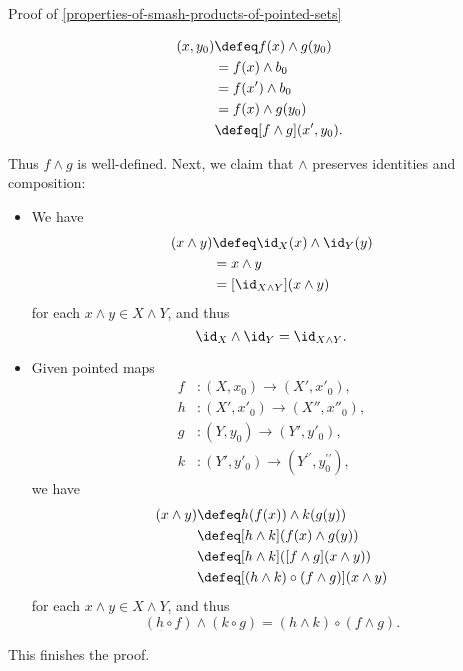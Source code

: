 \begin{Proof}{Proof of \cref{properties-of-smash-products-of-pointed-sets}}
\begin{enumerate}
            \begin{align*}
                [f\wedge g](x,y_{0}) &\defeq f(x)\wedge g(y_{0})\\%
                                     &=      f(x)\wedge b_{0}\\%
                                     &=      f(x')\wedge b_{0}\\%
                                     &=      f(x)\wedge g(y_{0})\\%
                                     &\defeq [f\wedge g](x',y_{0}).%
            \end{align*}
    \end{enumerate}
    Thus $f\wedge g$ is well-defined. Next, we claim that $\wedge$ preserves identities and composition:
    \begin{itemize}
        \item{}We have
            \begin{align*}
                [\id_{X}\wedge\id_{Y}](x\wedge y) &\defeq \id_{X}(x)\wedge\id_{Y}(y)\\
                                                  &=      x\wedge y\\
                                                  &=      [\id_{X\wedge Y}](x\wedge y)
            \end{align*}
            for each $x\wedge y\in X\wedge Y$, and thus
            \[
                \id_{X}\wedge\id_{Y}%
                =%
                \id_{X\wedge Y}.%
            \]%
        \item{}Given pointed maps
            \begin{align*}
                f &\colon (X,x_{0})   \to (X',x'_{0}),\\
                h &\colon (X',x'_{0}) \to (X'',x''_{0}),\\
                g &\colon (Y,y_{0}) \to (Y',y'_{0}),\\
                k &\colon (Y',y'_{0}) \to (Y^{\prime\prime},y^{\prime\prime}_{0}),
            \end{align*}
            we have
            \begin{align*}
                [(h\circ f)\wedge(k\circ g)](x\wedge y) &\defeq h(f(x))\wedge k(g(y))\\
                                                        &\defeq [h\wedge k](f(x)\wedge g(y))\\
                                                        &\defeq [h\wedge k]([f\wedge g](x\wedge y))\\
                                                        &\defeq [(h\wedge k)\circ(f\wedge g)](x\wedge y)
            \end{align*}
            for each $x\wedge y\in X\wedge Y$, and thus
            \[
                (h\circ f)\wedge(k\circ g)%
                =%
                (h\wedge k)\circ(f\wedge g).%
            \]%
    \end{itemize}
    This finishes the proof.


\end{Proof}

